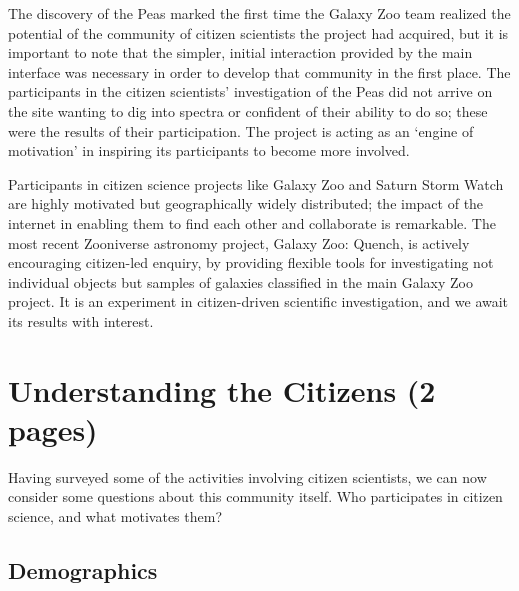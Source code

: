 \documentclass{ar2e}
\begin{document}
The discovery of the Peas marked the first time the Galaxy Zoo team realized the
potential of the community of citizen scientists the project had acquired, but
it is important to note that the simpler, initial interaction provided by the
main interface was necessary in order to develop that community in the first
place. The participants in the citizen scientists' investigation of the Peas did
not arrive on the site wanting to dig into spectra or confident of their ability
to do so; these were the results of their participation. The project is
acting as an `engine of motivation' in inspiring
its participants to become more involved. 


Participants in citizen science projects like Galaxy Zoo and Saturn Storm Watch 
are highly motivated but geographically widely distributed; the impact of the
internet in enabling them to find each other and collaborate is remarkable. The
most recent Zooniverse astronomy project, Galaxy Zoo: Quench, is actively
encouraging citizen-led enquiry, by providing flexible tools for investigating
not individual objects but samples of galaxies classified in the main Galaxy Zoo
project. It is an experiment in citizen-driven scientific investigation, and we
await its results with interest.

% 
% 



\section{Understanding the Citizens (2 pages)}
\label{sec:crowd}

Having surveyed some of the activities involving citizen scientists, we can
now consider some questions about this community itself. Who participates in
citizen science, and what motivates them?



\subsection{Demographics}
\label{sec:crowd:demographics}
\end{document}
